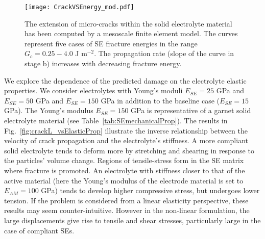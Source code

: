 \documentclass[final,5p,sort&compress]{elsarticle}
\begin{document}
\begin{figure}
\texttt{[image: CrackVSEnergy\_mod.pdf]} 
\caption{The extension of micro-cracks within the solid electrolyte material has been computed by a mesoscale finite element model. The curves represent five cases of SE fracture energies in the range $G_c = 0.25 - 4.0 $ J m$^{-2}$. 
The propagation rate (slope of the curve in stage b) increases with decreasing fracture energy.}
\label{fig:crackL_vsFractureEnergy}
\end{figure}


%

We explore the dependence of the predicted damage on the electrolyte elastic properties. 
We consider electrolytes with 
Young's moduli $E_{SE} = 25$ GPa and $E_{SE} = 50$ GPa and $E_{SE} = 150$ GPa in addition to the baseline case ($E_{SE} = 15$ GPa).
The Young's modulus $E_{SE} = 150$ GPa is representative of a garnet solid electrolyte material (see Table~\ref{tab:SEmechanicalProp}).
%
%
The results in Fig.~\ref{fig:crackL_vsElasticProp} illustrate the inverse relationship between the velocity of crack propagation and the electrolyte's stiffness. 
%
A more compliant solid electrolyte 
tends to deform more by stretching and shearing in response to the particles' volume change. 
Regions of tensile-stress form in the SE matrix where fracture is promoted.  
An electrolyte with stiffness closer to that of the active material (here the Young's modulus of the electrode material is set to $E_{AM} = 100$ GPa) tends to develop higher compressive stress, but undergoes lower tension.
If the problem is considered from a linear elasticity perspective, these results may seem counter-intuitive.  However in the non-linear formulation, the large displacements give rise to tensile and shear stresses, particularly large in the case of compliant SEs.
 
\end{document}
